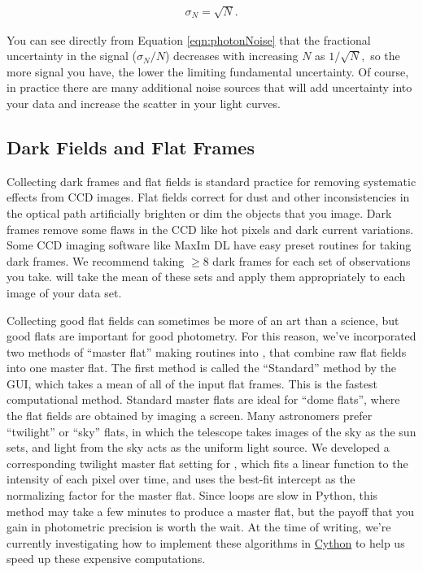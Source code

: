\documentclass{article}
\begin{document}
\begin{eqnarray}
\sigma_N = \sqrt{N}. \label{eqn:photonNoise}
\end{eqnarray}

\noindent You can see directly from Equation \ref{eqn:photonNoise} that the fractional uncertainty in the signal ($\sigma_N/N$) decreases with increasing $N$ as $1/\sqrt{N},$
so the more signal you have, the lower the limiting fundamental uncertainty. Of course, in practice there are many additional noise sources that will add uncertainty into your data and increase the scatter in your light curves. 
 
\subsection{Dark Fields and Flat Frames}

Collecting dark frames and flat fields is standard practice for removing systematic effects from CCD images. Flat fields correct for dust and other inconsistencies in the optical path artificially brighten or dim the objects that you image. Dark frames remove some flaws in the CCD like hot pixels and dark current variations. Some CCD imaging software like MaxIm DL have easy preset routines for taking dark frames.  We recommend taking $\ge8$ dark frames for each set of observations you take. \oscaar will take the mean of these sets and apply them appropriately to each image of your data set. 

Collecting good flat fields can sometimes be more of an art than a science, but good flats are important for good photometry. For this reason, we've incorporated two methods of ``master flat'' making routines into \oscaar, that combine raw flat fields into one master flat. The first method is called the ``Standard'' method by the \oscaar GUI, which takes a mean of all of the input flat frames. This is the fastest computational method. Standard master flats are ideal for ``dome flats'', where the flat fields are obtained by imaging a screen. Many astronomers prefer ``twilight'' or ``sky'' flats, in which the telescope takes images of the sky as the sun sets, and light from the sky acts as the uniform light source. We developed a corresponding twilight master flat setting for \oscaar, which fits a linear function to the intensity of each pixel over time, and uses the best-fit intercept as the normalizing factor for the master flat. Since loops are slow in Python, this method may take a few minutes to produce a master flat, but the payoff that you gain in photometric precision is worth the wait. At the time of writing, we're currently investigating how to implement these algorithms in \href{http://www.cython.org/}{Cython} to help us speed up these expensive computations.
\end{document}
